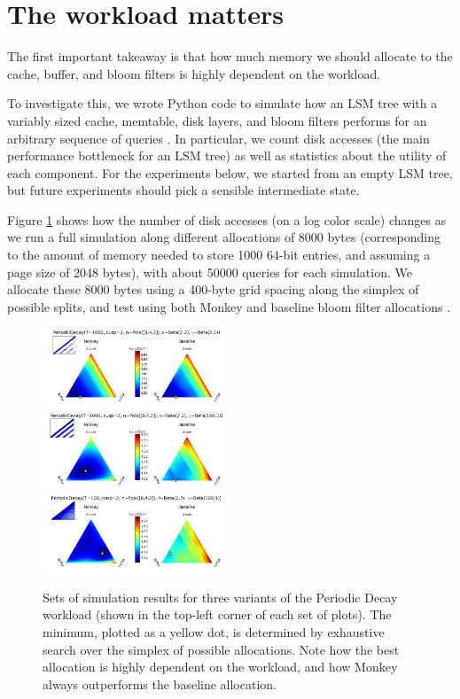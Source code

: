 \documentclass{sig-alternate-05-2015}
\begin{document}
\pagebreak

\section{The workload matters}

The first important takeaway is that how much memory we should allocate to the cache,
buffer, and bloom filters is highly dependent on the workload.

To investigate this, we wrote Python code to simulate how an LSM tree with a
variably sized cache, memtable, disk layers, and bloom filters performs for an
arbitrary sequence of queries \cite{lsmulator}. In particular, we count disk
accesses (the main performance bottleneck for an LSM tree) as well as
statistics about the utility of each component. For the experiments below, we
started from an empty LSM tree, but future experiments should pick a sensible
intermediate state.

Figure \ref{fig:period-lsmulations} shows how the number of disk accesses (on a log
color scale) changes as we run a full simulation along different allocations of
8000 bytes (corresponding to the amount of memory needed to store 1000 64-bit
entries, and assuming a page size of 2048 bytes), with about 50000 queries
for each simulation. We allocate these 8000 bytes using a 400-byte grid spacing
along the simplex of possible splits, and test using both Monkey and baseline
bloom filter allocations \cite{monkey}.

\begin{figure}[!htb]
\begin{center}
\includegraphics[width=0.5\textwidth]{period2.png}
\includegraphics[width=0.5\textwidth]{period1.png}
\includegraphics[width=0.5\textwidth]{period3.png}
\end{center}
\caption{Sets of simulation results for three variants of the Periodic Decay
workload (shown in the top-left corner of each set of plots). The minimum,
plotted as a yellow dot, is determined by exhaustive search over the simplex
of possible allocations. Note how the best allocation is highly dependent
on the workload, and how Monkey always outperforms the baseline allocation.}
\label{fig:period-lsmulations}
\end{figure}
\end{document}
